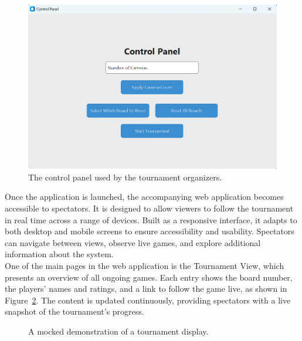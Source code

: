 \begin{figure}[h!] \centering \includegraphics[width=0.75\linewidth]{figures/results/frontend/control-panel/control-panel.png} \caption[Control panel for tournament organizers]{The control panel used by the tournament organizers.}\label{fig:control-panel} \end{figure}

Once the application is launched, the accompanying web application becomes accessible to spectators. It is designed to allow viewers to follow the tournament in real time across a range of devices. Built as a responsive interface, it adapts to both desktop and mobile screens to ensure accessibility and usability. Spectators can navigate between views, observe live games, and explore additional information about the system. \\

One of the main pages in the web application is the Tournament View, which presents an overview of all ongoing games. Each entry shows the board number, the players' names and ratings, and a link to follow the game live, as shown in Figure~\ref{fig:tournament-view-mocked}. The content is updated continuously, providing spectators with a live snapshot of the tournament's progress. \\

\begin{figure}[h!] \centering {}\caption[Display of tournament]{A mocked demonstration of a tournament display.}\label{fig:tournament-view-mocked} \end{figure}

